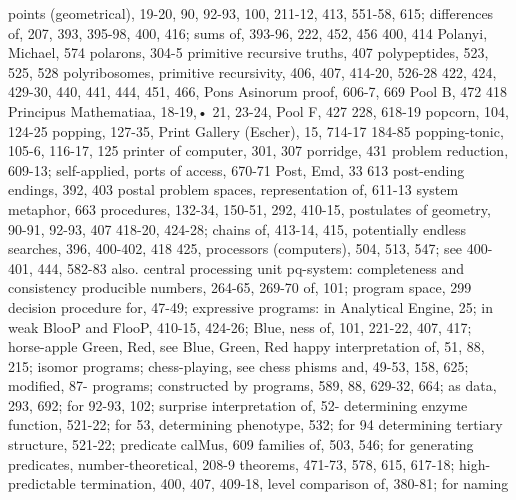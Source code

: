 points (geometrical), 19-20, 90, 92-93, 100,    211-12, 413, 551-58, 615; differences of,
207,                                            393, 395-98, 400, 416; sums of, 393-96,
222, 452, 456                                   400, 414
Polanyi, Michael, 574 polarons, 304-5           primitive recursive truths, 407
polypeptides, 523, 525, 528 polyribosomes,      primitive recursivity, 406, 407, 414-20,
526-28                                          422, 424, 429-30, 440, 441, 444, 451, 466,
Pons Asinorum proof, 606-7, 669 Pool B,         472
418                                             Principus Mathematiaa, 18-19,• 21, 23-24,
Pool F, 427                                     228, 618-19
popcorn, 104, 124-25 popping, 127-35,           Print Gallery (Escher), 15, 714-17
184-85 popping-tonic, 105-6, 116-17, 125        printer of computer, 301, 307
porridge, 431                                   problem reduction, 609-13; self-applied,
ports of access, 670-71 Post, Emd, 33           613
post-ending endings, 392, 403 postal            problem spaces, representation of, 611-13
system metaphor, 663                            procedures, 132-34, 150-51, 292, 410-15,
postulates of geometry, 90-91, 92-93, 407       418-20, 424-28; chains of, 413-14, 415,
potentially endless searches, 396, 400-402,     418
425,                                            processors (computers), 504, 513, 547; see
400-401, 444, 582-83                            also. central processing unit
pq-system: completeness and consistency         producible numbers, 264-65, 269-70
of, 101;                                        program space, 299
decision procedure for, 47-49; expressive       programs: in Analytical Engine, 25; in
weak                                            BlooP and FlooP, 410-15, 424-26; Blue,
ness of, 101, 221-22, 407, 417; horse-apple     Green, Red, see Blue, Green, Red
happy interpretation of, 51, 88, 215; isomor    programs; chess-playing, see chess
phisms and, 49-53, 158, 625; modified, 87-      programs; constructed by programs, 589,
88,                                             629-32, 664; as data, 293, 692; for
92-93, 102; surprise interpretation of, 52-     determining enzyme function, 521-22; for
53,                                             determining      phenotype,      532;     for
94                                              determining tertiary structure, 521-22;
predicate calMus, 609                           families of, 503, 546; for generating
predicates, number-theoretical, 208-9           theorems, 471-73, 578, 615, 617-18; high-
predictable termination, 400, 407, 409-18,      level comparison of, 380-81; for naming
